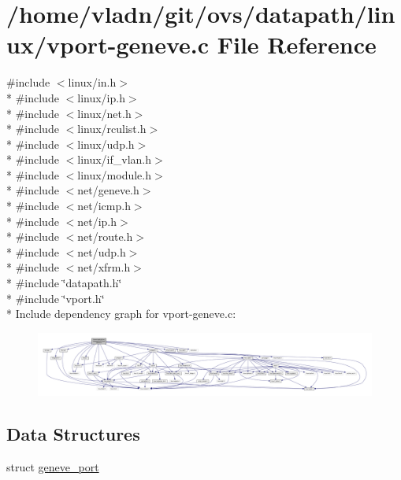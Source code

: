 \hypertarget{linux_2vport-geneve_8c}{}\section{/home/vladn/git/ovs/datapath/linux/vport-\/geneve.c File Reference}
\label{linux_2vport-geneve_8c}
{\ttfamily \#include $<$linux/in.\+h$>$}\\*
{\ttfamily \#include $<$linux/ip.\+h$>$}\\*
{\ttfamily \#include $<$linux/net.\+h$>$}\\*
{\ttfamily \#include $<$linux/rculist.\+h$>$}\\*
{\ttfamily \#include $<$linux/udp.\+h$>$}\\*
{\ttfamily \#include $<$linux/if\+\_\+vlan.\+h$>$}\\*
{\ttfamily \#include $<$linux/module.\+h$>$}\\*
{\ttfamily \#include $<$net/geneve.\+h$>$}\\*
{\ttfamily \#include $<$net/icmp.\+h$>$}\\*
{\ttfamily \#include $<$net/ip.\+h$>$}\\*
{\ttfamily \#include $<$net/route.\+h$>$}\\*
{\ttfamily \#include $<$net/udp.\+h$>$}\\*
{\ttfamily \#include $<$net/xfrm.\+h$>$}\\*
{\ttfamily \#include \char`\"{}datapath.\+h\char`\"{}}\\*
{\ttfamily \#include \char`\"{}vport.\+h\char`\"{}}\\*
Include dependency graph for vport-\/geneve.c\+:
\nopagebreak
\begin{figure}[H]
\begin{center}
\leavevmode
\includegraphics[width=350pt]{linux_2vport-geneve_8c__incl}
\end{center}
\end{figure}
\subsection*{Data Structures}
\begin{DoxyCompactItemize}
\item 
struct \hyperlink{structgeneve__port}{geneve\+\_\+port}
\end{DoxyCompactItemize}
